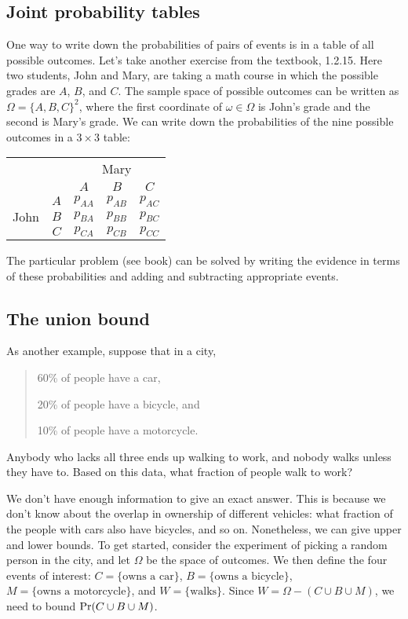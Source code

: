 \documentclass{report}
\theoremstyle{plain}
\theoremstyle{definition}
\newcommand{\pr}{\mbox{\rm Pr}}
\begin{document}
\subsection{Joint probability tables}

One way to write down the probabilities of pairs of events is in a table of all possible outcomes. Let's take another exercise from the textbook, 1.2.15. Here two students, John and Mary, are taking a math course in which the possible grades are $A$, $B$, and $C$. The sample space of possible outcomes can be written as $\Omega = \{A,B,C\}^2$, where the first coordinate of $\omega \in \Omega$ is John's grade and the second is Mary's grade. We can write down the probabilities of the nine possible outcomes in a $3 \times 3$ table:

\begin{center}
\begin{tabular}{|cc|ccc|} \hline
\multicolumn{2}{|c|}{} & \multicolumn{3}{c|}{Mary} \\ 
\multicolumn{2}{|c|}{} & $A$ & $B$ & $C$ \\ \hline
\multirow{3}{*}{John} & $A$ & $p_{AA}$ & $p_{AB}$ & $p_{AC}$ \\ 
                      & $B$ & $p_{BA}$ & $p_{BB}$ & $p_{BC}$ \\ 
                      & $C$ & $p_{CA}$ & $p_{CB}$ & $p_{CC}$ \\ \hline
\end{tabular} 
\end{center}

\noindent
The particular problem (see book) can be solved by writing the evidence in terms of these probabilities and adding and subtracting appropriate events.

\subsection{The union bound}

As another example, suppose that in a city,
\begin{quote}
60\% of people have a car,

20\% of people have a bicycle, and

10\% of people have a motorcycle.
\end{quote}
Anybody who lacks all three ends up walking to work, and nobody walks unless they have to. Based on this data, what fraction of people walk to work?

We don't have enough information to give an exact answer. This is because we don't know about the overlap in ownership of different vehicles: what fraction of the people with cars also have bicycles, and so on. Nonetheless, we can give upper and lower bounds. To get started, consider the experiment of picking a random person in the city, and let $\Omega$ be the space of outcomes. We then define the four events of interest: $C = \{\mbox{owns a car}\}$, $B = \{\mbox{owns a bicycle}\}$, $M = \{\mbox{owns a motorcycle}\}$, and $W = \{\mbox{walks}\}$. Since $W = \Omega - (C \cup B \cup M)$, we need to bound $\pr(C \cup B \cup M)$.
\end{document}
